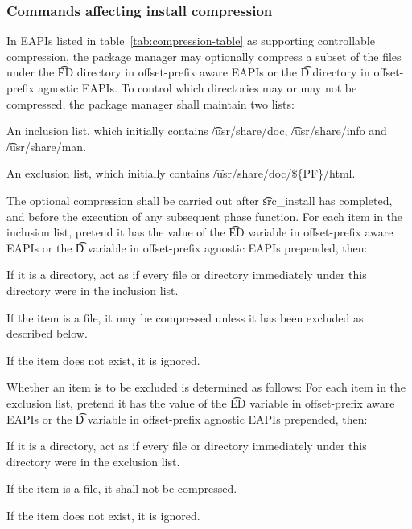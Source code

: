 \subsubsection{Commands affecting install compression}

 In EAPIs listed in table~\ref{tab:compression-table} as
supporting controllable compression, the package manager may optionally compress a subset of the files
under the \t{ED} directory in offset-prefix aware EAPIs or the \t{D} directory in offset-prefix
agnostic EAPIs. To control which directories may or may not be compressed, the package manager shall
maintain two lists:

\begin{compactitem}
\item An inclusion list, which initially contains \t{/usr/share/doc}, \t{/usr/share/info} and
    \t{/usr/share/man}.
\item An exclusion list, which initially contains \t{/usr/share/doc/\$\{PF\}/html}.
\end{compactitem}

The optional compression shall be carried out after \t{src\_install} has completed, and before the
execution of any subsequent phase function. For each item in the inclusion list, pretend it has the
value of the \t{ED} variable in offset-prefix aware EAPIs or the \t{D}
variable in offset-prefix agnostic EAPIs prepended, then:

\begin{compactitem}
\item If it is a directory, act as if every file or directory immediately under this directory
    were in the inclusion list.
\item If the item is a file, it may be compressed unless it has been excluded as described below.
\item If the item does not exist, it is ignored.
\end{compactitem}

Whether an item is to be excluded is determined as follows: For each item in the exclusion list,
pretend it has the value of the \t{ED} variable in offset-prefix aware EAPIs or the \t{D} variable in
offset-prefix agnostic EAPIs prepended, then:

\begin{compactitem}
\item If it is a directory, act as if every file or directory immediately under this directory
    were in the exclusion list.
\item If the item is a file, it shall not be compressed.
\item If the item does not exist, it is ignored.
\end{compactitem}

